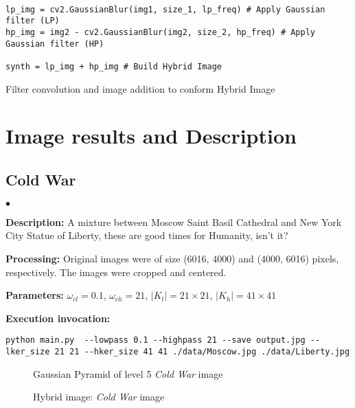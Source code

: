 \documentclass{article}
\newcommand{\squishlist}{
 \begin{list}{$\bullet$}
  { \setlength{\itemsep}{0pt}
     \setlength{\parsep}{3pt}
     \setlength{\topsep}{3pt}
     \setlength{\partopsep}{0pt}
     \setlength{\leftmargin}{1.5em}
     \setlength{\labelwidth}{1em}
     \setlength{\labelsep}{0.5em} } }
\newcommand{\squishend}{
  \end{list}  }
\begin{document}
\begin{listing}[H]
	\begin{verbatim}

lp_img = cv2.GaussianBlur(img1, size_1, lp_freq) # Apply Gaussian filter (LP)
hp_img = img2 - cv2.GaussianBlur(img2, size_2, hp_freq) # Apply Gaussian filter (HP)

synth = lp_img + hp_img # Build Hybrid Image
\end{verbatim}
\caption{Filter convolution and image addition to conform Hybrid Image}
\end{listing}

\section*{Image results and Description}
\subsection*{Cold War}
\squishlist
\item \textbf{Description:} A mixture between Moscow Saint Basil Cathedral and New York City Statue of Liberty, these are good times for Humanity, isn't it?
\item \textbf{Processing:} Original images were of size (6016, 4000) and (4000, 6016) pixels, respectively. The images were cropped and centered.
\item \textbf{Parameters:} $\omega_{cl} = 0.1$, $\omega_{ch} = 21$, $|K_{l}| = 21 \times 21$, $|K_{h}| = 41 \times 41$
\item \textbf{Execution invocation:}
\squishend

\begin{verbatim}
python main.py  --lowpass 0.1 --highpass 21 --save output.jpg --lker_size 21 21 --hker_size 41 41 ./data/Moscow.jpg ./data/Liberty.jpg
\end{verbatim}

\begin{figure*}[!htbp]
	\centering
	\caption{Gaussian Pyramid of level 5 \textit{Cold War} image}
\end{figure*}


\begin{figure*}[!htbp]
	\centering
	\caption{Hybrid image: \textit{Cold War} image}
\end{figure*}
\end{document}
